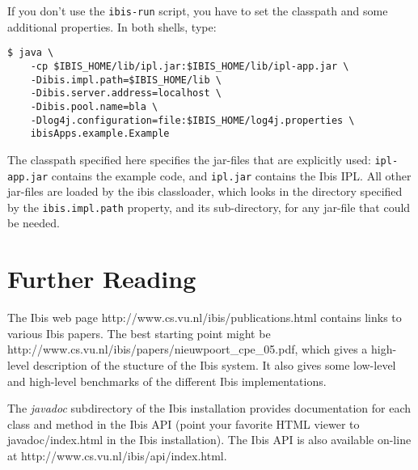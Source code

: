 \documentclass[10pt]{article}
\newcommand{\mysection}[1]{\section{#1}\label{#1}}
\begin{document}
If you don't use the \texttt{ibis-run} script, you have to set the classpath
and some additional properties. In both shells, type:

\noindent
{\small
\begin{verbatim}
$ java \
    -cp $IBIS_HOME/lib/ipl.jar:$IBIS_HOME/lib/ipl-app.jar \
    -Dibis.impl.path=$IBIS_HOME/lib \
    -Dibis.server.address=localhost \
    -Dibis.pool.name=bla \
    -Dlog4j.configuration=file:$IBIS_HOME/log4j.properties \
    ibisApps.example.Example
\end{verbatim}
}
\noindent
The classpath specified here specifies the jar-files that are explicitly used:
\texttt{ipl-app.jar} contains the example code, and \texttt{ipl.jar} contains
the Ibis IPL. All other jar-files are loaded by the ibis classloader, which
looks in the directory specified by the \texttt{ibis.impl.path} property,
and its sub-directory, for any jar-file that could be needed.

\mysection{Further Reading}

The Ibis web page http://www.cs.vu.nl/ibis/publications.html
contains links to various Ibis papers.
The best starting point might be \\
http://www.cs.vu.nl/ibis/papers/nieuwpoort\_cpe\_05.pdf,
which gives a high-level description of the stucture of the Ibis system.
It also gives some low-level and high-level benchmarks of the different Ibis implementations.

The \emph{javadoc} subdirectory of the Ibis installation provides
documentation for each class and method in the Ibis API (point your favorite
HTML viewer to javadoc/index.html in the Ibis installation).
The Ibis API is also available on-line at http://www.cs.vu.nl/ibis/api/index.html.
\end{document}
